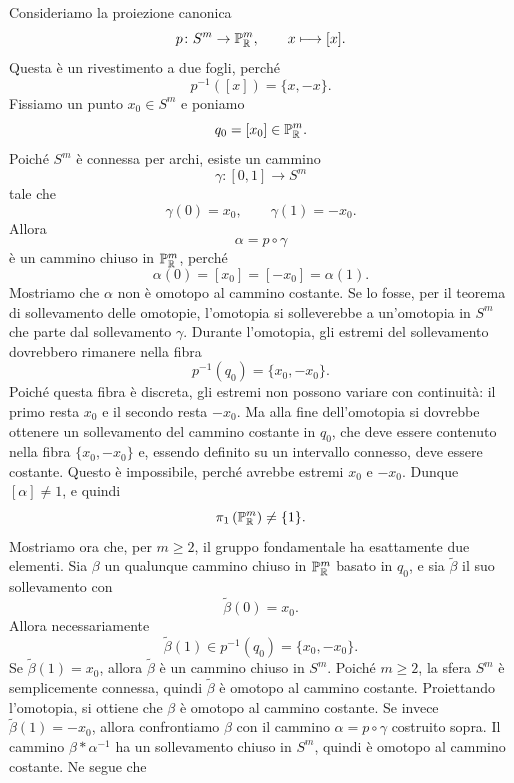\documentclass[a4paper]{article}
\begin{document}
\begin{snippetproof}{}
    Consideriamo la proiezione canonica
    \[
        p\colon S^m\to\mathbb{P}^m_{\mathbb{R}},
        \qquad
        x\longmapsto [x].
    \]
    Questa è un rivestimento a due fogli, perché
    \[
        p^{-1}([x])=\{x,-x\}.
    \]
    Fissiamo un punto \(x_0\in S^m\) e poniamo
    \[
        q_0=[x_0]\in\mathbb{P}^m_{\mathbb{R}}.
    \]
    Poiché \(S^m\) è connessa per archi, esiste un cammino
    \[
        \gamma\colon[0,1]\to S^m
    \]
    tale che
    \[
        \gamma(0)=x_0,
        \qquad
        \gamma(1)=-x_0.
    \]
    Allora
    \[
        \alpha=p\circ\gamma
    \]
    è un cammino chiuso in \(\mathbb{P}^m_{\mathbb{R}}\), perché
    \[
        \alpha(0)=[x_0]=[-x_0]=\alpha(1).
    \]
    Mostriamo che \(\alpha\) non è omotopo al cammino costante. Se lo fosse, per il teorema di sollevamento delle omotopie, l'omotopia si solleverebbe a un'omotopia in \(S^m\) che parte dal sollevamento \(\gamma\). Durante l'omotopia, gli estremi del sollevamento dovrebbero rimanere nella fibra
    \[
        p^{-1}(q_0)=\{x_0,-x_0\}.
    \]
    Poiché questa fibra è discreta, gli estremi non possono variare con continuità: il primo resta \(x_0\) e il secondo resta \(-x_0\). Ma alla fine dell'omotopia si dovrebbe ottenere un sollevamento del cammino costante in \(q_0\), che deve essere contenuto nella fibra \(\{x_0,-x_0\}\) e, essendo definito su un intervallo connesso, deve essere costante. Questo è impossibile, perché avrebbe estremi \(x_0\) e \(-x_0\). Dunque \([\alpha]\neq 1\), e quindi
    \[
        \pi_1\left(\mathbb{P}^m_{\mathbb{R}}\right)\neq\{1\}.
    \]
    Mostriamo ora che, per \(m\geq2\), il gruppo fondamentale ha esattamente due elementi. Sia \(\beta\) un qualunque cammino chiuso in \(\mathbb{P}^m_{\mathbb{R}}\) basato in \(q_0\), e sia \(\widetilde{\beta}\) il suo sollevamento con
    \[
        \widetilde{\beta}(0)=x_0.
    \]
    Allora necessariamente
    \[
        \widetilde{\beta}(1)\in p^{-1}(q_0)=\{x_0,-x_0\}.
    \]
    Se \(\widetilde{\beta}(1)=x_0\), allora \(\widetilde{\beta}\) è un cammino chiuso in \(S^m\). Poiché \(m\geq2\), la sfera \(S^m\) è semplicemente connessa, quindi \(\widetilde{\beta}\) è omotopo al cammino costante. Proiettando l'omotopia, si ottiene che \(\beta\) è omotopo al cammino costante.
    Se invece \(\widetilde{\beta}(1)=-x_0\), allora confrontiamo \(\beta\) con il cammino \(\alpha=p\circ\gamma\) costruito sopra. Il cammino \(\beta*\alpha^{-1}\) ha un sollevamento chiuso in \(S^m\), quindi è omotopo al cammino costante. Ne segue che

\end{snippetproof}
\end{document}

